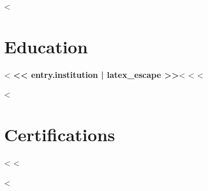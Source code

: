 \documentclass[11pt]{article}
\begin{document}
<%
\section*{Education}
<%
\textbf{<< entry.institution | latex_escape >>}<%
<%
<%

<%
\section*{Certifications}
\begin{itemize}[leftmargin=*, noitemsep]
<%
<%
\end{itemize}
<%
\end{document}
